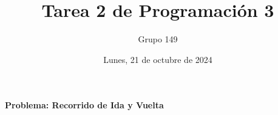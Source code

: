 \documentclass[a4paper,12pt]{article}
\title{Tarea 2 de Programación 3}
\author{Grupo 149}
\date{Lunes, 21 de octubre de 2024}
\begin{document}
\maketitle


\newpage

\textbf{Problema: Recorrido de Ida y Vuelta}


\end{document}
